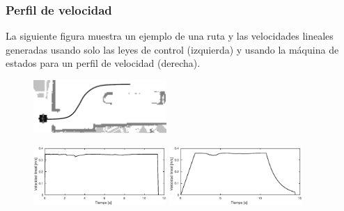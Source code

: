 \begin{frame}\frametitle{Perfil de velocidad}
  La siguiente figura muestra un ejemplo de una ruta y las velocidades lineales generadas usando solo las leyes de control (izquierda) y usando la máquina de estados para un perfil de velocidad (derecha). 
  \begin{figure}
    \centering
    \includegraphics[width=0.45\textwidth]{Figures/SpeedProfilePath.png}
  \end{figure}
  \begin{figure}
    \centering
    \includegraphics[width=0.45\textwidth]{Figures/SpeedWithoutProfile.eps}
    \includegraphics[width=0.45\textwidth]{Figures/SpeedWithProfile.eps}
  \end{figure}
\end{frame}

